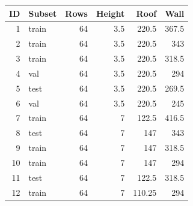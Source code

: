 \begin{center}
\small
\setlength{\tabcolsep}{4pt}
\begin{tabular}{@{}rlrrrr@{}}
\toprule
ID & Subset & Rows & Height & Roof & Wall\\
\midrule
1 & train & 64 & 3.5 & 220.5 & 367.5\\
2 & train & 64 & 3.5 & 220.5 & 343\\
3 & train & 64 & 3.5 & 220.5 & 318.5\\
4 & val & 64 & 3.5 & 220.5 & 294\\
5 & test & 64 & 3.5 & 220.5 & 269.5\\
6 & val & 64 & 3.5 & 220.5 & 245\\
7 & train & 64 & 7 & 122.5 & 416.5\\
8 & test & 64 & 7 & 147 & 343\\
9 & train & 64 & 7 & 147 & 318.5\\
10 & train & 64 & 7 & 147 & 294\\
11 & test & 64 & 7 & 122.5 & 318.5\\
12 & train & 64 & 7 & 110.25 & 294\\
\bottomrule
\end{tabular}
\end{center}